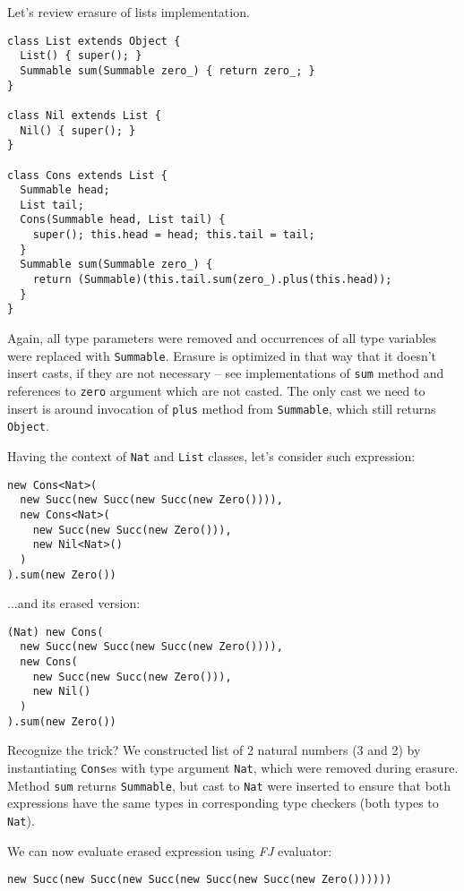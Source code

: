 \documentclass{article}[12pt]
\begin{document}
Let's review erasure of lists implementation.

\begin{verbatim}
class List extends Object {
  List() { super(); }
  Summable sum(Summable zero_) { return zero_; }
}

class Nil extends List {
  Nil() { super(); }
}

class Cons extends List {
  Summable head;
  List tail;
  Cons(Summable head, List tail) {
    super(); this.head = head; this.tail = tail;
  }
  Summable sum(Summable zero_) {
    return (Summable)(this.tail.sum(zero_).plus(this.head));
  }
}
\end{verbatim}

Again, all type parameters were removed and occurrences of all
type variables were replaced with \texttt{Summable}. Erasure is
optimized in that way that it doesn't insert casts, if they are
not necessary -- see implementations of \texttt{sum} method
and references to \texttt{zero} argument which are not casted.
The only cast we need to insert is around invocation of \texttt{plus}
method from \texttt{Summable}, which still returns \texttt{Object}.

Having the context of \texttt{Nat} and \texttt{List} classes,
let's consider such expression:

\begin{verbatim}
new Cons<Nat>(
  new Succ(new Succ(new Succ(new Zero()))),
  new Cons<Nat>(
    new Succ(new Succ(new Zero())),
    new Nil<Nat>()
  )
).sum(new Zero())
\end{verbatim}
...and its erased version:
\begin{verbatim}
(Nat) new Cons(
  new Succ(new Succ(new Succ(new Zero()))),
  new Cons(
    new Succ(new Succ(new Zero())),
    new Nil()
  )
).sum(new Zero())
\end{verbatim}

Recognize the trick? We constructed list of 2 natural numbers
(3 and 2) by instantiating \texttt{Cons}es with type argument
\texttt{Nat}, which were removed during erasure. Method
\texttt{sum} returns \texttt{Summable}, but cast to
\texttt{Nat} were inserted to ensure that both expressions have
the same types in corresponding type checkers (both types
to \texttt{Nat}).

We can now evaluate erased expression using \emph{FJ} evaluator:

\begin{verbatim}
new Succ(new Succ(new Succ(new Succ(new Succ(new Zero())))))
\end{verbatim}
\end{document}
